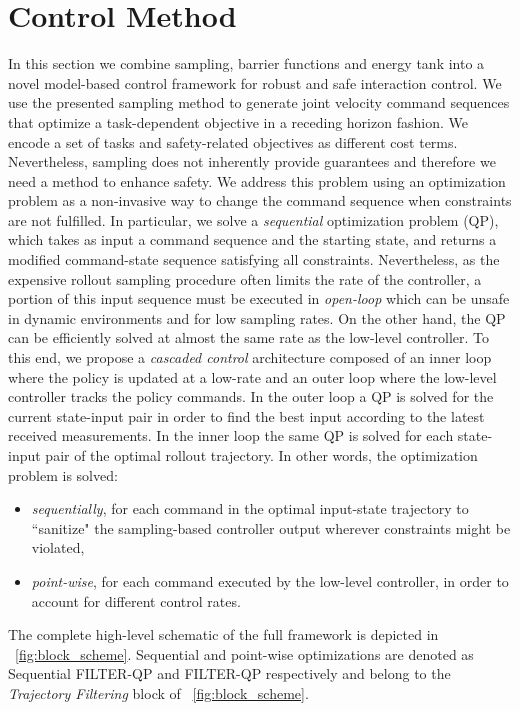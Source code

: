 \section{Control Method} \label{sec:control_method}

In this section we combine sampling, barrier functions and energy tank into a novel model-based control framework for robust and safe interaction control. We use the presented sampling method to generate joint velocity command sequences that optimize a task-dependent objective in a receding horizon fashion. We encode a set of tasks and safety-related objectives as different cost terms. Nevertheless, sampling does not inherently provide guarantees and therefore we need a method to enhance safety. We address this problem using an optimization problem as a non-invasive way to change the command sequence when constraints are not fulfilled. In particular, we solve a \textit{sequential} optimization problem (QP), which takes as input a command sequence and the starting state, and returns a modified command-state sequence satisfying all constraints. Nevertheless, as the expensive rollout sampling procedure often limits the rate of the controller, a portion of this input sequence must be executed in \textit{open-loop} which can be unsafe in dynamic environments and for low sampling rates. On the other hand, the QP can be efficiently solved at almost the same rate as the low-level controller. To this end, we propose a \emph{cascaded control} architecture composed of an inner loop where the policy is updated at a low-rate and an outer loop  where the low-level controller tracks the policy commands. In the outer loop a QP is solved for the current state-input pair in order to find the best input according to the latest received measurements. In the inner loop the same QP is solved for each state-input pair of the optimal rollout trajectory.
In other words, the optimization problem is solved:
\begin{itemize}
    \item \textit{sequentially}, for each command in the optimal input-state trajectory to ``sanitize" the sampling-based controller output wherever constraints might be violated,
    \item \textit{point-wise}, for each command executed by the low-level controller, in order to account for different control rates.
\end{itemize}
The complete high-level schematic of the full framework is depicted in \fig~\ref{fig:block_scheme}. Sequential and point-wise optimizations are denoted as Sequential FILTER-QP and FILTER-QP respectively and belong to the \textit{Trajectory Filtering} block of \fig~\ref{fig:block_scheme}. 

